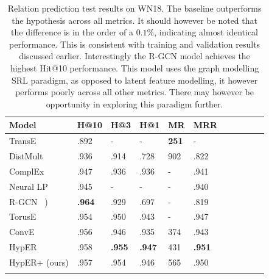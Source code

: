 
\begin{table}[H]
		\centering
		\begin{tabular}{lllllllllll}
  			\textbf{Model} & \textbf{H@10} & \textbf{H@3} & \textbf{H@1} & \textbf{MR} & \textbf{MRR} \\
  			\hline
  			TransE \unskip~\citep{bordes2013translating} & .892 & - & - & \textbf{251} & - \\
  			DistMult \unskip~\citep{yang2014embedding} & .936 & .914 & .728 & 902 & .822 \\
  			ComplEx \unskip~\citep{trouillon2016complex} & .947 & .936 & .936 & - & .941 \\
  			Neural LP \unskip~\citep{yang2017differentiable} & .945 & - & - & - & .940 \\
			R-GCN \unskip~\citep{schlichtkrull2018modeling}) & \textbf{.964} & .929 & .697 & - & .819 \\
			TorusE \unskip~\citep{ebisu2018toruse} & .954 & .950 & .943 & - & .947 \\
			ConvE \unskip~\citep{dettmers2018convolutional} & .956 & .946 & .935 & 374 & .943 \\
			HypER \unskip~\citep{balazevic2019hypernetwork} & .958 & \textbf{.955} & \textbf{.947} & 431 & \textbf{.951} \\
  			\hline
  			HypER+ (ours) & .957 & .954 & .946 & 565 & .950 \\
			&
		\end{tabular}
		\captionsetup{justification=centering}
		\caption{Relation prediction test results on WN18. The baseline outperforms the hypothesis across all metrics. It should however be noted that the difference is in the order of a $ 0.1\% $, indicating almost identical performance. This is consistent with training and validation results discussed earlier. Interestingly the R-GCN model achieves the highest Hit@10 performance. This model uses the graph modelling SRL paradigm, as opposed to latent feature modelling, it however performs poorly across all other metrics. There may however be opportunity in exploring this paradigm further. }
\end{table}

